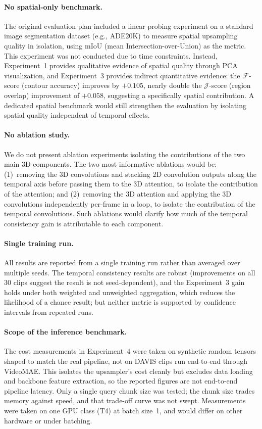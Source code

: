 \paragraph{No spatial-only benchmark.}
The original evaluation plan included a linear probing experiment on a standard image segmentation dataset (e.g., ADE20K) to measure spatial upsampling quality in isolation, using mIoU (mean Intersection-over-Union) as the metric.
This experiment was not conducted due to time constraints.
Instead, Experiment~1 provides qualitative evidence of spatial quality through PCA visualization, and Experiment~3 provides indirect quantitative evidence: the $\mathcal{F}$-score (contour accuracy) improves by $+0.105$, nearly double the $\mathcal{J}$-score (region overlap) improvement of $+0.058$, suggesting a specifically spatial contribution.
A dedicated spatial benchmark would still strengthen the evaluation by isolating spatial quality independent of temporal effects.

\paragraph{No ablation study.}
We do not present ablation experiments isolating the contributions of the two main 3D components.
The two most informative ablations would be: (1)~removing the 3D convolutions and stacking 2D convolution outputs along the temporal axis before passing them to the 3D attention, to isolate the contribution of the attention; and (2)~removing the 3D attention and applying the 3D convolutions independently per-frame in a loop, to isolate the contribution of the temporal convolutions.
Such ablations would clarify how much of the temporal consistency gain is attributable to each component.

\paragraph{Single training run.}
All results are reported from a single training run rather than averaged over multiple seeds.
The temporal consistency results are robust (improvements on all 30 clips suggest the result is not seed-dependent), and the Experiment~3 gain holds under both weighted and unweighted aggregation, which reduces the likelihood of a chance result; but neither metric is supported by confidence intervals from repeated runs.

\paragraph{Scope of the inference benchmark.}
The cost measurements in Experiment~4 were taken on synthetic random tensors shaped to match the real pipeline, not on DAVIS clips run end-to-end through VideoMAE.
This isolates the upsampler's cost cleanly but excludes data loading and backbone feature extraction, so the reported figures are not end-to-end pipeline latency.
Only a single query chunk size was tested; the chunk size trades memory against speed, and that trade-off curve was not swept.
Measurements were taken on one GPU class (T4) at batch size~1, and would differ on other hardware or under batching.

